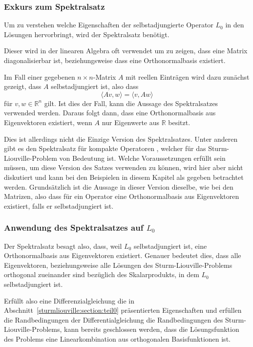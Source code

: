 \subsubsection{Exkurs zum Spektralsatz}

Um zu verstehen welche Eigenschaften der selbstadjungierte Operator $L_0$ in 
den Lösungen hervorbringt, wird der Spektralsatz benötigt.

Dieser wird in der linearen Algebra oft verwendet um zu zeigen, dass eine Matrix
diagonalisierbar ist, beziehungsweise dass eine Orthonormalbasis existiert.

Im Fall einer gegebenen $n\times n$-Matrix $A$ mit reellen Einträgen wird dazu 
zunächst gezeigt, dass $A$ selbstadjungiert ist, also dass
\[
    \langle Av, w \rangle
    =
    \langle v, Aw \rangle
\]
für $ v, w \in \mathbb{R}^n$ gilt.
Ist dies der Fall, kann die Aussage des Spektralsatzes
\cite{sturmliouville:spektralsatz-wiki} verwended werden.
Daraus folgt dann, dass eine Orthonormalbasis aus Eigenvektoren existiert,
wenn $A$ nur Eigenwerte aus $\mathbb{R}$ besitzt.

Dies ist allerdings nicht die Einzige Version des Spektralsatzes.
Unter anderen gibt es den Spektralsatz für kompakte Operatoren
\cite{sturmliouville:spektralsatz-wiki}, welcher für das
Sturm-Liouville-Problem von Bedeutung ist.
Welche Voraussetzungen erfüllt sein müssen, um diese Version des
Satzes verwenden zu können, wird hier aber nicht diskutiert und kann bei den
Beispielen in diesem Kapitel als gegeben betrachtet werden.
Grundsätzlich ist die Aussage in dieser Version dieselbe, wie bei den Matrizen,
also dass für ein Operator eine Orthonormalbasis aus Eigenvektoren existiert,
falls er selbstadjungiert ist.

\subsubsection{Anwendung des Spektralsatzes auf $L_0$}

Der Spektralsatz besagt also, dass, weil $L_0$ selbstadjungiert ist, eine
Orthonormalbasis aus Eigenvektoren existiert.
Genauer bedeutet dies, dass alle Eigenvektoren, beziehungsweise alle Lösungen
des Sturm-Liouville-Problems orthogonal zueinander sind bezüglich des
Skalarprodukts, in dem $L_0$ selbstadjungiert ist.

Erfüllt also eine Differenzialgleichung die in
Abschnitt~\ref{sturmliouville:section:teil0} präsentierten Eigenschaften und
erfüllen die Randbedingungen der Differentialgleichung die Randbedingungen
des Sturm-Liouville-Problems, kann bereits geschlossen werden, dass die
Lösungsfunktion des Problems eine Linearkombination aus orthogonalen
Basisfunktionen ist.

\fi
